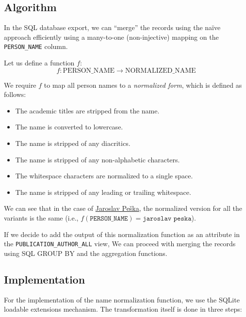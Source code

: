 \subsection{Algorithm}

In the SQL database export, we can ``merge'' the records using the naïve approach efficiently using a many-to-one (non-injective) mapping
on the \texttt{PERSON\_NAME} column.

Let us define a function $f$:
$$f: \text{PERSON\_NAME} \to \text{NORMALIZED\_NAME}$$

We require $f$ to map all person names to a \textit{normalized form}, which is defined as follows:
\begin{itemize}
    \item The academic titles are stripped from the name.
    \item The name is converted to lowercase.
    \item The name is stripped of any diacritics.
    \item The name is stripped of any non-alphabetic characters.
    \item The whitespace characters are normalized to a single space.
    \item The name is stripped of any leading or trailing whitespace.
\end{itemize}

We can see that in the case of \hyperref[fig:jaroslav-peska]{Jaroslav Peška}, 
the normalized version for all the variants is the same (i.e., $f(\texttt{PERSON\_NAME}) = \texttt{jaroslav peska}$).

If we decide to add the output of this normalization function as an attribute in the \texttt{PUBLICATION\_AUTHOR\_ALL} view,
We can proceed with merging the records using SQL GROUP BY and the aggregation functions.

\subsection{Implementation}

For the implementation of the name normalization function, we use the SQLite loadable extensions mechanism.
The transformation itself is done in three steps:

